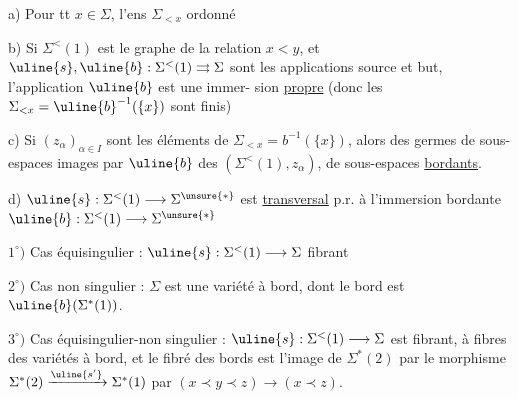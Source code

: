 
a) Pour tt $x\in\Sigma$, l'ens $\Sigma_{<x}$ 
 ordonné

b) Si $\Sigma^{<}(1)$ est le graphe de la relation
$x<y$, et $\uline{s},\uline{b}:\Sigma^{<}(1)\rightrightarrows\Sigma$ sont les applications
source et but, \deleted{\unsure{---}} l'application $\uline{b}$ est une immer-
sion  \uline{propre} (donc les $\Sigma_{<x}=\uline{b}^{-1}(\{x\})$
sont finis)

c) Si $(z_\alpha)_{\alpha\in I}$ sont les éléments de $\Sigma_{<x}=b^{-1}(\{x\})$,
alors  des germes  de sous-espaces 
images par $\uline{b}$ des  $(\Sigma^{<}(1),z_\alpha)$, 
de sous-espaces \uline{bordants}.

d) $\uline{s}:\Sigma^{<}(1)\longrightarrow\Sigma^{\unsure{*}}$ est \uline{transversal} p.r. à l'immersion
bordante $\uline{b}:\Sigma^{<}(1)\longrightarrow\Sigma^{\unsure{*}}$

$1^{\circ})$ Cas équisingulier : $\uline{s}:\Sigma^{<}(1)\longrightarrow\Sigma$ fibrant 

$2^{\circ})$ Cas non singulier : $\Sigma$ est une variété à bord,
dont le bord est $\uline{b}(\Sigma^{*}(1))$.

$3^{\circ})$ Cas équisingulier-non singulier : $\uline{s}:\Sigma^{<}(1)\longrightarrow\Sigma$ est
fibrant,  à fibres des variétés à bord, et le
fibré des bords est l'image de $\Sigma^{*}(2)$ par
le morphisme $\Sigma^{*}(2)\xrightarrow{\uline{s'}}\Sigma^{*}(1)$ 
par $(x\prec y\prec z)\longrightarrow(x\prec z)$.
